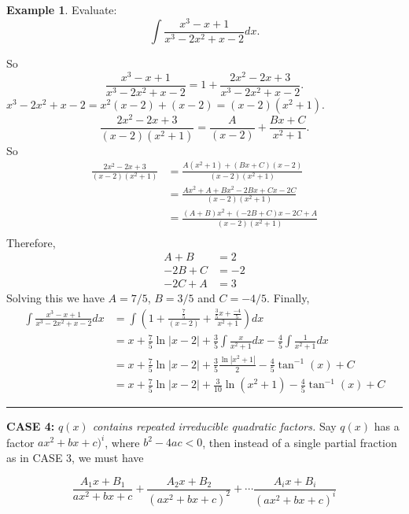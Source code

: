 \documentclass[reqno]{amsart}
\theoremstyle{definition}
\newtheorem{eg}[lem]{Example}
\numberwithin{equation}{section}
\begin{document}
\begin{eg} Evaluate:
\[ \int \frac{x^3-x+1}{x^3-2x^2+x-2} dx. \]
\begin{center}
\end{center}
So 
\[ \frac{x^3-x+1}{x^3-2x^2+x-2} = 1 + \frac{2x^2-2x+3}{x^3-2x^2+x-2}.\]
 $x^3-2x^2+x-2=x^2(x-2)+(x-2)=(x-2)(x^2+1)$.\\
\[\frac{2x^2-2x+3}{(x-2)(x^2+1)} = \frac{A}{(x-2)}+\frac{Bx+C}{x^2+1}.\]
So
\begin{align*}
\frac{2x^2-2x+3}{(x-2)(x^2+1)} &= \frac{A(x^2+1)+(Bx+C)(x-2)}{(x-2)(x^2+1)}\\
&=  \frac{Ax^2+A+Bx^2-2Bx+Cx-2C}{(x-2)(x^2+1)}\\
&=  \frac{(A+B)x^2+(-2B+C)x-2C+A}{(x-2)(x^2+1)}\\
\end{align*}
Therefore,
\begin{align*}
A+B&=2\\
-2B+C&=-2\\
-2C+A&=3
\end{align*}
Solving this we have
$A=7/5$, $B=3/5$ and $C=-4/5$.
Finally,
\begin{align*}
\int \frac{x^3-x+1}{x^3-2x^2+x-2} dx &= \int \left(1+\frac{\frac{7}{5}}{(x-2)}+\frac{\frac{3}{5}x+\frac{-4}{5}}{x^2+1} \right) dx \\
&= x+\frac{7}{5}\ln|x-2|+\frac{3}{5}\int \frac{x}{x^2+1} dx -\frac{4}{5}\int \frac{1}{x^2+1} dx\\
&= x+\frac{7}{5}\ln|x-2|+\frac{3}{5}\frac{\ln|x^2+1|}{2} -\frac{4}{5}\tan^{-1}(x) +C\\
&= x+\frac{7}{5}\ln|x-2|+\frac{3}{10}\ln(x^2+1) -\frac{4}{5}\tan^{-1}(x) +C
\end{align*}
\end{eg}

\hrule
\vspace{1pc}

{\bf CASE 4:} {\it $q(x)$ contains repeated irreducible quadratic factors.}
Say $q(x)$ has a factor $ax^2+bx+c)^i$, where $b^2-4ac<0$, then instead of a single partial fraction as in CASE 3, we must have

\[ \frac{A_1x+B_1}{ax^2+bx+c} + \frac{A_2x+B_2}{(ax^2+bx+c)^2} +\cdots \frac{A_ix+B_i}{(ax^2+bx+c)^i}\]
\end{document}
